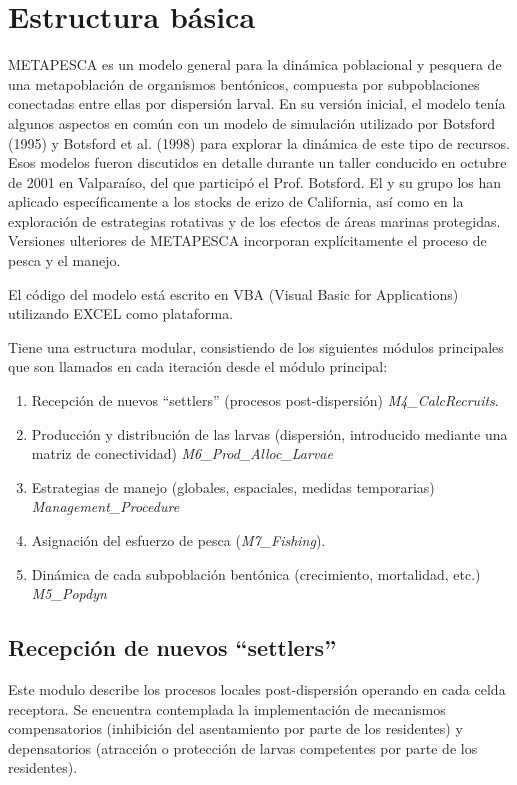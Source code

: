 	\section{Estructura básica}

		METAPESCA es un modelo general para la dinámica poblacional y pesquera de una metapoblación de organismos bentónicos, compuesta por subpoblaciones conectadas entre ellas por dispersión larval. En su versión inicial, el modelo tenía algunos aspectos en común con un modelo de simulación utilizado por Botsford (1995) y Botsford et al. (1998) para explorar la dinámica de este tipo de recursos. Esos modelos fueron discutidos en detalle durante un taller conducido en octubre de 2001 en Valparaíso, del que participó el Prof. Botsford. El y su grupo los han aplicado específicamente a los stocks de erizo de California, así como en la exploración de estrategias rotativas y de los efectos de áreas marinas protegidas. Versiones ulteriores de METAPESCA incorporan explícitamente el proceso de pesca y el manejo.
		
		
		El código del modelo está escrito en VBA (Visual Basic for Applications) utilizando EXCEL como plataforma. 

		Tiene una estructura modular, consistiendo de los siguientes módulos principales que son llamados en cada iteración desde el módulo principal:

			\begin{enumerate}
				\item Recepción de nuevos “settlers” (procesos post-dispersión) \emph{M4\_CalcRecruits}.
				\item Producción y distribución de las larvas (dispersión, introducido mediante una matriz de conectividad) \emph{M6\_Prod\_Alloc\_Larvae}
				\item Estrategias de manejo (globales, espaciales, medidas temporarias) \emph{Management\_Procedure}
				\item Asignación del esfuerzo de pesca (\emph{M7\_Fishing}).						
				\item Dinámica de cada subpoblación bentónica (crecimiento, mortalidad, etc.) \emph{M5\_Popdyn}

			\end{enumerate}

		\subsection {Recepción de nuevos “settlers”}
			Este modulo describe los procesos locales post-dispersión operando en cada celda receptora. Se encuentra contemplada la implementación de mecanismos compensatorios (inhibición del asentamiento por parte de los residentes) y depensatorios (atracción o protección de larvas competentes por parte de los residentes).

